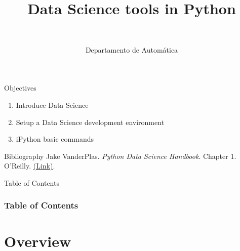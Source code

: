 \documentclass[10pt,compress]{beamer} %
\title[Data Science tools]{Data Science tools in Python}
\author{\asignatura\\\carrera}
\institute{}
\date{Departamento de Automática}
\begin{document}
{\titlepageBlue
    \begin{frame}
        \titlepage
    \end{frame}
}

\institute{\asignatura}

\begin{frame}[plain]{}
	\begin{block}{Objectives}
		\begin{enumerate}
		\item Introduce Data Science
		\item Setup a Data Science development environment
		\item iPython basic commands
		\end{enumerate}
	\end{block}

   \begin{block}{Bibliography}
       Jake VanderPlas. \textit{Python Data Science Handbook}. Chapter 1. O'Reilly. \href{https://jakevdp.github.io/PythonDataScienceHandbook/}{(Link)}.
   \end{block}

\end{frame}

{
\begin{frame}[shrink]{Table of Contents}
 \frametitle{Table of Contents}
 \begin{multicols}{2}
 \tableofcontents
 \end{multicols}
\end{frame}
}

\section{Overview}
\end{document}
